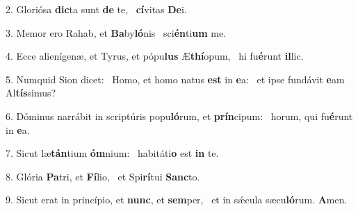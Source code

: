 2. Gloriósa \textbf{dic}ta sunt \textbf{de} te, \ast\  \textbf{cí}vitas \textbf{De}i.\

3. Memor ero Rahab, et \textbf{Ba}by\textbf{ló}nis \ast\  sci\textbf{én}ti\textbf{um} me.\

4. Ecce alienígenæ, et Tyrus, et pópu\textbf{lus} Æ\textbf{thí}opum, \ast\  hi fu\textbf{é}runt \textbf{il}lic.\

5. Numquid Sion dicet: \dag\  Homo, et homo natus \textbf{est} in \textbf{e}a: \ast\  et ipse fundávit \textbf{e}am Al\textbf{tís}simus?\

6. Dóminus narrábit in scriptúris popu\textbf{ló}rum, et \textbf{prín}cipum: \ast\  horum, qui fu\textbf{é}runt in \textbf{e}a.\

7. Sicut læ\textbf{tán}tium \textbf{óm}nium: \ast\  habitáti\textbf{o} est \textbf{in} te.\

8. Glória \textbf{Pa}tri, et \textbf{Fí}lio, \ast\  et Spi\textbf{rí}tui \textbf{Sanc}to.\

9. Sicut erat in princípio, et \textbf{nunc}, et \textbf{sem}per, \ast\  et in sǽcula sæcu\textbf{ló}rum. \textbf{A}men.\

